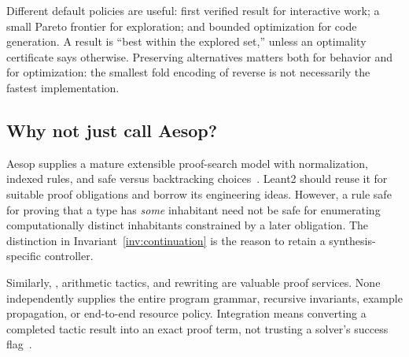Different default policies are useful: first verified result for interactive
work; a small Pareto frontier for exploration; and bounded optimization for
code generation. A result is ``best within the explored set,'' unless an
optimality certificate says otherwise. Preserving alternatives matters both
for behavior and for optimization: the smallest fold encoding of reverse is
not necessarily the fastest implementation.

\subsection{Why not just call Aesop?}

Aesop supplies a mature extensible proof-search model with normalization,
indexed rules, and safe versus backtracking choices~\cite{aesop}. Leant2 should
reuse it for suitable proof obligations and borrow its engineering ideas.
However, a rule safe for proving that a type has \emph{some} inhabitant need not
be safe for enumerating computationally distinct inhabitants constrained by a
later obligation. The distinction in Invariant~\ref{inv:continuation} is the
reason to retain a synthesis-specific controller.

Similarly, , arithmetic tactics, and rewriting are valuable proof
services. None independently supplies the entire program grammar, recursive
invariants, example propagation, or end-to-end resource policy. Integration
means converting a completed tactic result into an exact proof term, not
trusting a solver's success flag~\cite{lean-grind}.
